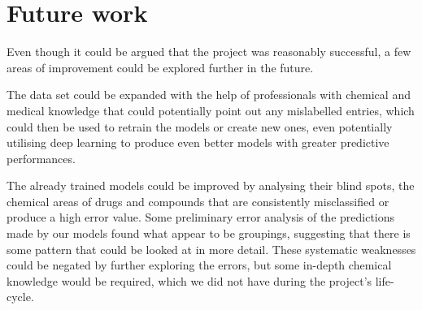 \section{Future work}

Even though it could be argued that the project was reasonably successful, a few areas of improvement could be explored further in the future. 

The data set could be expanded with the help of professionals with chemical and medical knowledge that could potentially point out any mislabelled entries, which could then be used to retrain the models or create new ones, even potentially utilising deep learning to produce even better models with greater predictive performances.

The already trained models could be improved by analysing their blind spots, the chemical areas of drugs and compounds that are consistently misclassified or produce a high error value. Some preliminary error analysis of the predictions made by our models found what appear to be groupings, suggesting that there is some pattern that could be looked at in more detail. These systematic weaknesses could be negated by further exploring the errors, but some in-depth chemical knowledge would be required, which we did not have during the project's life-cycle.
